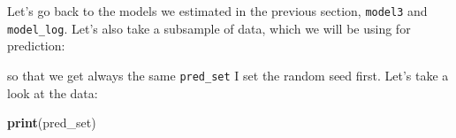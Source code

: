 \documentclass[]{gitbook}
\newenvironment{Shaded}{\begin{snugshade}}{\end{snugshade}}
\newcommand{\DecValTok}[1]{\textcolor[rgb]{0.00,0.00,0.81}{#1}}
\newcommand{\KeywordTok}[1]{\textcolor[rgb]{0.13,0.29,0.53}{\textbf{#1}}}
\newcommand{\NormalTok}[1]{#1}
\newcommand{\OperatorTok}[1]{\textcolor[rgb]{0.81,0.36,0.00}{\textbf{#1}}}
\newcommand{\StringTok}[1]{\textcolor[rgb]{0.31,0.60,0.02}{#1}}
\theoremstyle{definition}
\theoremstyle{definition}
\theoremstyle{definition}
\theoremstyle{remark}
\begin{document}
Let's go back to the models we estimated in the previous section,
\texttt{model3} and \texttt{model\_log}. Let's also take a subsample of
data, which we will be using for prediction:

\begin{Shaded}
\end{Shaded}

so that we get always the same \texttt{pred\_set} I set the random seed
first. Let's take a look at the data:

\begin{Shaded}
\begin{Highlighting}[]
\KeywordTok{print}\NormalTok{(pred_set)}
\end{Highlighting}
\end{Shaded}
\end{document}
